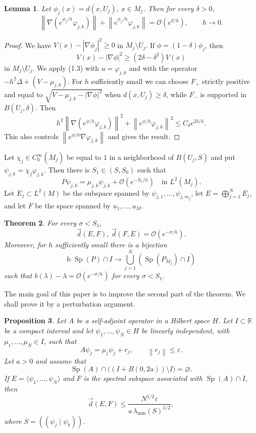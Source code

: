\documentclass[11pt,a4paper]{article}
\newcommand{\R}{\mathbb R}
\newcommand{\Sp}{\operatorname{Sp}}
\newcommand{\cO}{\mathcal O}
\newcommand{\eps}{\varepsilon}
\newcommand{\norm}[1]{\left\lVert #1\right\rVert}
\newcommand{\ip}[2]{\left(#1\mid #2\right)}
\newcommand{\dvec}{\overset{\rightarrow}{d}}
\numberwithin{equation}{section}
\newtheorem{theorem}{Theorem}[section]
\newtheorem{lemma}[theorem]{Lemma}
\newtheorem{proposition}[theorem]{Proposition}
\theoremstyle{remark}
\begin{document}
\begin{lemma}
Let $\phi_j(x)=d(x,U_j)$, $x\in M_j$. Then for every $\delta>0$,
\begin{equation}
\norm{\nabla(e^{\phi_j/h}\varphi_{j,k})}+\norm{e^{\phi_j/h}\varphi_{j,k}}
=\cO(e^{\delta/h}),\qquad h\to0.
\end{equation}
\end{lemma}
\begin{proof}
We have $V(x)-|\nabla\phi_j|^2\ge0$ in $M_j\setminus U_j$. If $\phi=(1-\delta)\phi_j$, then
\[
V(x)-|\nabla\phi|^2\ge(2\delta-\delta^2)V(x)
\]
in $M_j\setminus U_j$. We apply (1.3) with $u=\varphi_{j,k}$ and with the operator $-h^2\Delta+(V-\mu_{j,k})$. For $h$ sufficiently small we can choose $F_+$ strictly positive and equal to $\sqrt{V-\mu_{j,k}-|\nabla\phi|^2}$ when $d(x,U_j)\ge\delta$, while $F_-$ is supported in $B(U_j,\delta)$. Then
\[
h^2\norm{\nabla(e^{\phi/h}\varphi_{j,k})}^2+
\norm{e^{\phi/h}\varphi_{j,k}}^2\le C_\delta e^{2\delta/h}.
\]
This also controls $\norm{e^{\phi/h}\nabla\varphi_{j,k}}$ and gives the result.
\end{proof}

Let $\chi_j\in C_0^\infty(\mathring M_j)$ be equal to $1$ in a neighborhood of $B(U_j,S)$ and put $\psi_{j,k}=\chi_j\varphi_{j,k}$. Then there is $S_1\in(S,S_0)$ such that
\begin{equation}
P\psi_{j,k}=\mu_{j,k}\psi_{j,k}+\cO(e^{-S_1/h})\quad\text{in }L^2(M_j).
\end{equation}
Let $E_j\subset L^2(M)$ be the subspace spanned by $\psi_{j,1},\ldots,\psi_{j,m_j}$, let $E=\bigoplus_{j=1}^N E_j$, and let $F$ be the space spanned by $u_1,\ldots,u_M$.

\begin{theorem}
For every $\sigma<S_1$,
\[
\dvec(E,F),\ \dvec(F,E)=\cO(e^{-\sigma/h}).
\]
Moreover, for $h$ sufficiently small there is a bijection
\[
b:\Sp(P)\cap I\longrightarrow\bigcup_{j=1}^N(\Sp(P_{M_j})\cap I)
\]
such that $b(\lambda)-\lambda=\cO(e^{-\sigma/h})$ for every $\sigma<S_1$.
\end{theorem}
The main goal of this paper is to improve the second part of the theorem. We shall prove it by a perturbation argument.

\begin{proposition}
Let $A$ be a self-adjoint operator in a Hilbert space $H$. Let $I\subset\R$ be a compact interval and let $\psi_1,\ldots,\psi_N\in H$ be linearly independent, with $\mu_1,\ldots,\mu_N\in I$, such that
\begin{equation}
A\psi_j=\mu_j\psi_j+r_j,\qquad\norm{r_j}\le\eps.
\end{equation}
Let $a>0$ and assume that
\[
\Sp(A)\cap\bigl((I+B(0,2a))\setminus I\bigr)=\varnothing.
\]
If $E=\langle\psi_1,\ldots,\psi_N\rangle$ and $F$ is the spectral subspace associated with $\Sp(A)\cap I$, then
\begin{equation}
\dvec(E,F)\le \frac{N^{1/2}\eps}{a\,\lambda_{\min}(S)^{1/2}},
\end{equation}
where $S=(\ip{\psi_j}{\psi_k})$.
\end{proposition}
\end{document}

